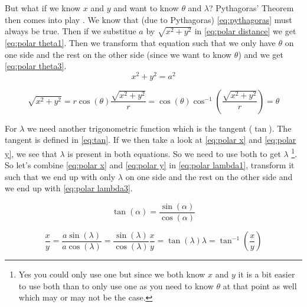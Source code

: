 But what if we know $x$ and $y$ and want to know $\theta$ and $\lambda$? Pythagoras' Theorem then comes into play \cite{pythagoras}. We know that (due to Pythagoras) \autoref{eq:pythagoras} must 
always be true. Then if we substitue $a$ by $\sqrt{x^2 + y^2}$ in \autoref{eq:polar distance} we get \autoref{eq:polar theta1}. Then we transform that equation such that we only have $\theta$ on 
one side and the rest on the other side (since we want to know $\theta$) and we get \autoref{eq:polar theta3}.
\begin{equation}
    x^2 + y^2 = a^2
    \label{eq:pythagoras}
\end{equation}

\begin{subequations}
    \begin{equation}
        \sqrt{x^2 + y^2} = r\cos(\theta)
        \label{eq:polar theta1}
    \end{equation}
    \begin{equation}
        \frac{\sqrt{x^2 + y^2}}{r} = \cos(\theta)
        \label{eq:polar theta2}
    \end{equation}
    \begin{equation}
        \cos^{-1}(\frac{\sqrt{x^2 + y^2}}{r}) = \theta
        \label{eq:polar theta3}
    \end{equation}
\end{subequations}

For $\lambda$ we need another trigonometric function which is the tangent ($\tan$). The tangent is defined in \autoref{eq:tan}. If we then take a look at \autoref{eq:polar x} and 
\autoref{eq:polar y}, we see that $\lambda$ is present in both equations. So we need to use both to get $\lambda$ \footnote{Yes you could only use one but since we both know $x$ and $y$ it is a
bit easier to use both than to only use one as you need to know $\theta$ at that point as well which may or may not be the case.}. So let's combine \autoref{eq:polar x} and \autoref{eq:polar y}
in \autoref{eq:polar lambda1}, transform it such that we end up with only $\lambda$ on one side and the rest on the other side and we end up with \autoref{eq:polar lambda3}.

\begin{equation}
    \tan(\alpha) = \frac{\sin(\alpha)}{\cos(\alpha)}
    \label{eq:tan}
\end{equation}

\begin{subequations}
    \begin{equation}
        \frac{x}{y} = \frac{a\sin(\lambda)}{a\cos(\lambda)} = \frac{\sin(\lambda)}{\cos(\lambda)}
        \label{eq:polar lambda1}
    \end{equation}
    \begin{equation}
        \frac{x}{y} = \tan(\lambda)
        \label{eq:polar lambda2}
    \end{equation}
    \begin{equation}
        \lambda = \tan^{-1}(\frac{x}{y})
        \label{eq:polar lambda3}
    \end{equation}
\end{subequations}

